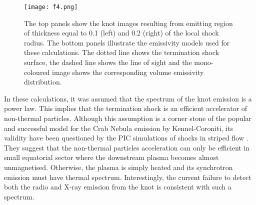 \begin{figure}[h!]
\begin{center}
\texttt{[image: f4.png]}
\caption{The top panels show the knot images resulting from emitting region of thickness equal to 0.1 (left) and 0.2 (right) of the local shock radius. The bottom panels illustrate the emissivity models used for these calculations. The dotted line shows the termination shock surface, the dashed line shows the line of sight and the mono-coloured image shows the corresponding volume emissivity distribution. 
}
\end{center}
\label{thickness-effect}
\end{figure}

In these calculations, it was assumed that the spectrum of the knot emission is a power law. This implies that the termination shock is an efficient accelerator of non-thermal particles. Although this assumption is a corner stone of the popular and successful model for the Crab Nebula emission by Kennel-Coroniti, its validity have been questioned by the PIC simulations of shocks in striped flow \citep{SS-11}. They suggest that the non-thermal particles acceleration can only be efficient in small equatorial sector where the downstream plasma becomes almost unmagnetised.  Otherwise, the plasma is simply heated and its synchrotron emission must have thermal spectrum.  Interestingly, the current failure to detect both the radio and X-ray emission from the knot  is consistent with such a spectrum.      


